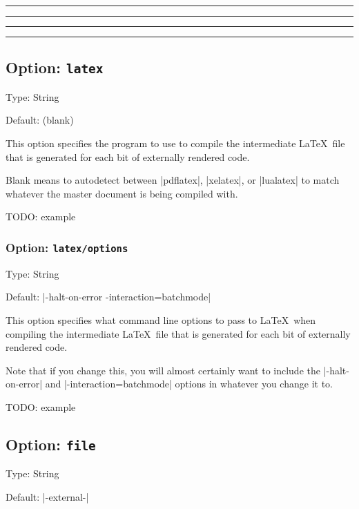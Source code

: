 \documentclass[10pt]{ltxdoc}
\newcommand{\opt}[1]{\texttt{#1}}
\def\gauge{%
  \rule{0.2em}{7pt}%
  \llap{\rule[8pt]{0.2em}{2pt}}%
}
\begin{document}
\begin{tcblisting}{}
\gauge
{}%
\gauge
\end{tcblisting}

\begin{tcblisting}{}
\gauge
{}%
\gauge
\end{tcblisting}

\subsection{Option: \opt{latex}}
\label{subsec:latex}

Type: String

Default: (blank)

This option specifies the program to use to compile the intermediate
\LaTeX\ file that is generated for each bit of externally rendered
code.

Blank means to autodetect between |pdflatex|, |xelatex|, or |lualatex|
to match whatever the master document is being compiled with.

TODO: example

\subsubsection{Option: \opt{latex/options}}
\label{subsubsec:latex/options}

Type: String

Default: |-halt-on-error -interaction=batchmode|

This option specifies what command line options to pass to \LaTeX\ when
compiling the intermediate \LaTeX\ file that is generated for each bit
of externally rendered code.

Note that if you change this, you will almost certainly want to include
the |-halt-on-error| and |-interaction=batchmode| options in whatever
you change it to.

TODO: example

\subsection{Option: \opt{file}}
\label{subsec:file}

Type: String

Default: |\jobname-external-|
\end{document}
